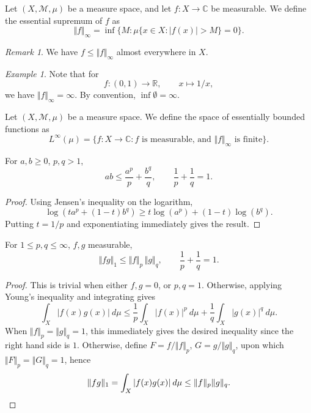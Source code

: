 \documentclass[11pt]{article}
\newcommand{\C}{\mathbb{C}}
\newcommand{\R}{\mathbb{R}}
\newcommand{\M}{\mathcal{M}}
\newcommand{\norm}[1]{\Vert #1 \Vert}
\theoremstyle{definition}
\theoremstyle{remark}
\newtheorem*{remark}{Remark}
\newtheorem*{example}{Example}
\numberwithin{equation}{section}
\begin{document}
    \begin{definition}
        Let $(X, \M, \mu)$ be a measure space, and let $f\colon X \to \C$ be
        measurable. We define the essential supremum of $f$ as \[
            \norm{f}_\infty = \inf \{M : \mu\{x \in X: |f(x)| > M\} = 0\}.
        \]
        \begin{remark}
            We have $f \leq \norm{f}_\infty$ almost everywhere in $X$.
        \end{remark}
    \end{definition}
    \begin{example}
        Note that for \[
            f\colon (0, 1) \to \R, \qquad x \mapsto 1 / x,
        \] we have $\norm{f}_\infty = \infty$. By convention, $\inf\emptyset =
        \infty$.
    \end{example}

    \begin{definition}
        Let $(X, \M, \mu)$ be a measure space. We define the space of essentially
        bounded functions as \[
            L^\infty(\mu) = \{f\colon X \to \C : f\text{ is measurable, and }
            \norm{f}_\infty \text{ is finite}\}.
        \]
    \end{definition}

    \begin{lemma}[Young]
        For $a, b \geq 0$, $p, q > 1$, \[
            ab \leq \frac{a^p}{p} + \frac{b^q}{q}, \qquad \frac{1}{p} + \frac{1}{q} =
            1.
        \]
    \end{lemma}
    \begin{proof}
        Using Jensen's inequality on the logarithm, \[
            \log(ta^p + (1 - t)b^q) \geq t\log(a^p) + (1 - t)\log(b^q).
        \] Putting $t = 1 / p$ and exponentiating immediately gives the result.
    \end{proof}

    \begin{lemma}[H\"older]
        For $1 \leq p, q \leq \infty$, $f, g$ measurable, \[
            \norm{fg}_1 \leq \norm{f}_p\, \norm{g}_q, \qquad \frac{1}{p}
            + \frac{1}{q} = 1.
        \]
    \end{lemma}
    \begin{proof}
        This is trivial when either $f, g = 0$, or $p, q = 1$.  Otherwise, applying
        Young's inequality and integrating gives
        \[
            \int_X |f(x)g(x)|\:d\mu \leq \frac{1}{p}\int_X |f(x)|^p\:d\mu +
            \frac{1}{q}\int_X |g(x)|^q\:d\mu.
        \] When $\norm{f}_p = \norm{g}_q = 1$, this immediately gives the desired
        inequality since the right hand side is $1$. Otherwise, define $F = f /
        \norm{f}_p$, $G = g / \norm{g}_q$, upon which $\norm{F}_p = \norm{G}_q = 1$,
        hence \[
            \norm{fg}_1 = \int_X |f(x)g(x)|\:d\mu \leq \norm{f}_p\norm{g}_q. \qedhere
        \]
    \end{proof}
\end{document}
